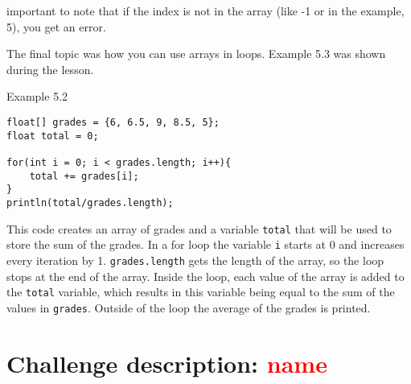 important to note that if the index is not in the array (like -1 or in the example, 5), you get an error.

\newpage

The final topic was how you can use arrays in loops. Example 5.3 was shown during the lesson.

\begin{codebox}{Example 5.2}
    \begin{lstlisting}
float[] grades = {6, 6.5, 9, 8.5, 5};
float total = 0;

for(int i = 0; i < grades.length; i++){
    total += grades[i];
} 
println(total/grades.length);
    \end{lstlisting}
\end{codebox}

This code creates an array of grades and a variable \texttt{total} that will be used to store the sum of the grades. In a for loop the variable \texttt{i} starts at 0 and increases every iteration by 1. \texttt{grades.length} gets the length of the array, so the loop stops at the end of the array. Inside the loop, each value of the array is added to the \texttt{total} variable, which results in this variable being equal to the sum of the values in \texttt{grades}. Outside of the loop the average of the grades is printed. 

\section{Challenge description: \textcolor{red}{name}}
